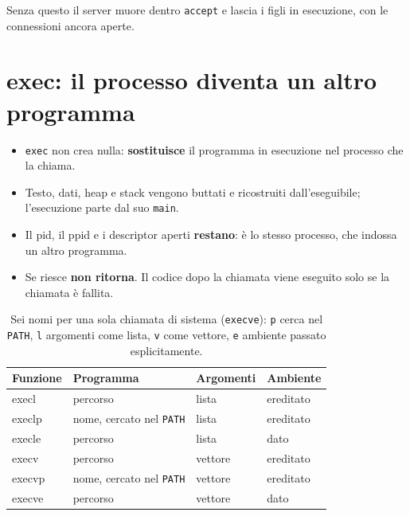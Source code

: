 Senza questo il server muore dentro \texttt{accept} e lascia i figli in esecuzione, con le connessioni ancora aperte.

\section{exec: il processo diventa un altro programma}

\begin{itemize}
    \item \texttt{exec} non crea nulla: \textbf{sostituisce} il programma in esecuzione nel processo che la chiama.
    \item Testo, dati, heap e stack vengono buttati e ricostruiti dall'eseguibile; l'esecuzione parte dal suo \texttt{main}.
    \item Il pid, il ppid e i descriptor aperti \textbf{restano}: è lo stesso processo, che indossa un altro programma.
    \item Se riesce \textbf{non ritorna}. Il codice dopo la chiamata viene eseguito solo se la chiamata è fallita.
\end{itemize}

\begin{table}[H]
\centering
\begin{tabular}{>{\ttfamily}l l l l}
\toprule
\normalfont\textbf{Funzione} & \textbf{Programma} & \textbf{Argomenti} & \textbf{Ambiente} \\
\midrule
execl  & percorso                  & lista   & ereditato \\
execlp & nome, cercato nel \texttt{PATH} & lista   & ereditato \\
execle & percorso                  & lista   & dato \\
execv  & percorso                  & vettore & ereditato \\
execvp & nome, cercato nel \texttt{PATH} & vettore & ereditato \\
execve & percorso                  & vettore & dato \\
\bottomrule
\end{tabular}
\caption{Sei nomi per una sola chiamata di sistema (\texttt{execve}): \texttt{p} cerca nel \texttt{PATH}, \texttt{l}
         argomenti come lista, \texttt{v} come vettore, \texttt{e} ambiente passato esplicitamente.}
\end{table}

